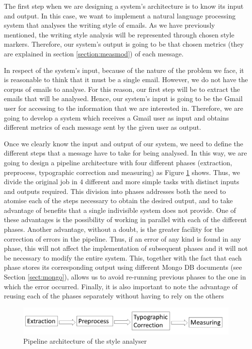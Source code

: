 The first step when we are designing a system's architecture is to know its input and output. In this case, we want to implement a natural language processing system that analyses the writing style of emails. As we have previously mentioned, the writing style analysis will be represented through chosen style markers. Therefore, our system's output is going to be that chosen metrics (they are explained in section \ref{section:measmod}) of each message.

In respect of the system's input, because of the nature of the problem we face, it is reasonable to think that it must be a single email. However, we do not have the corpus of emails to analyse. For this reason, our first step will be to extract the emails that will be analysed. Hence, our system's input is going to be the Gmail user for accessing to the information that we are interested in. Therefore, we are going to develop a system which receives a Gmail user as input and obtains different metrics of each message sent by the given user as output.

Once we clearly know the input and output of our system, we need to define the different steps that a message have to take for being analysed. In this way, we are going to design a pipeline architecture with four different phases (extraction, preprocess, typographic correction and measuring) as Figure \ref{fig:arch} shows. Thus, we divide the original job in 4 different and more simple tasks with distinct inputs and outputs required. This division into phases addresses both the need to atomise each of the steps necessary to obtain the desired output, and to take advantage of benefits that a single indivisible system does not provide. One of these advantages is the possibility of working in parallel with each of the different phases. Another advantage, without a doubt, is the greater facility for the correction of errors in the pipeline. Thus, if an error of any kind is found in any phase, this will not affect the implementation of subsequent phases and it will not be necessary to modify the entire system. This, together with the fact that each phase stores its corresponding output using different Mongo DB documents (see Section \ref{sect:mongo}), allows us to avoid re-running previous phases to the one in which the error occurred. Finally, it is also important to note the advantage of reusing each of the phases separately without having to rely on the others

\begin{figure}[h]
	\centering%
	\includegraphics[width = 1\textwidth]{Imagenes/Bitmap/architecture.png}%
	\caption{Pipeline architecture of the style analyser}%
	\label{fig:arch}
\end{figure}

